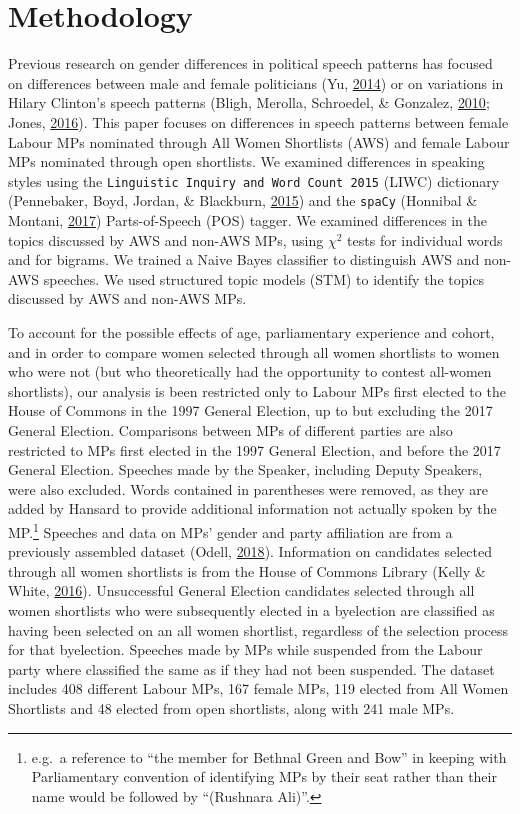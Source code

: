 \documentclass[]{article}
\let\rmarkdownfootnote\footnote%
\def\footnote{\protect\rmarkdownfootnote}
\begin{document}
\hypertarget{methodology}{%
\section{Methodology}\label{methodology}}

Previous research on gender differences in political speech patterns has
focused on differences between male and female politicians (Yu,
\protect\hyperlink{ref-yu2014}{2014}) or on variations in Hilary
Clinton's speech patterns (Bligh, Merolla, Schroedel, \& Gonzalez,
\protect\hyperlink{ref-bligh2010}{2010}; Jones,
\protect\hyperlink{ref-jones2016}{2016}). This paper focuses on
differences in speech patterns between female Labour MPs nominated
through All Women Shortlists (AWS) and female Labour MPs nominated
through open shortlists. We examined differences in speaking styles
using the \texttt{Linguistic\ Inquiry\ and\ Word\ Count\ 2015} (LIWC)
dictionary (Pennebaker, Boyd, Jordan, \& Blackburn,
\protect\hyperlink{ref-pennebaker2015}{2015}) and the \texttt{spaCy}
(Honnibal \& Montani, \protect\hyperlink{ref-honnibal2017}{2017})
Parts-of-Speech (POS) tagger. We examined differences in the topics
discussed by AWS and non-AWS MPs, using \({\chi}^2\) tests for
individual words and for bigrams. We trained a Naive Bayes classifier to
distinguish AWS and non-AWS speeches. We used structured topic models
(STM) to identify the topics discussed by AWS and non-AWS MPs.

To account for the possible effects of age, parliamentary experience and
cohort, and in order to compare women selected through all women
shortlists to women who were not (but who theoretically had the
opportunity to contest all-women shortlists), our analysis is been
restricted only to Labour MPs first elected to the House of Commons in
the 1997 General Election, up to but excluding the 2017 General
Election. Comparisons between MPs of different parties are also
restricted to MPs first elected in the 1997 General Election, and before
the 2017 General Election. Speeches made by the Speaker, including
Deputy Speakers, were also excluded. Words contained in parentheses were
removed, as they are added by Hansard to provide additional information
not actually spoken by the MP.\footnote{e.g.~a reference to ``the member
  for Bethnal Green and Bow'' in keeping with Parliamentary convention
  of identifying MPs by their seat rather than their name would be
  followed by ``(Rushnara Ali)''.} Speeches and data on MPs' gender and
party affiliation are from a previously assembled dataset (Odell,
\protect\hyperlink{ref-odell2018}{2018}). Information on candidates
selected through all women shortlists is from the House of Commons
Library (Kelly \& White, \protect\hyperlink{ref-kelly2016}{2016}).
Unsuccessful General Election candidates selected through all women
shortlists who were subsequently elected in a byelection are classified
as having been selected on an all women shortlist, regardless of the
selection process for that byelection. Speeches made by MPs while
suspended from the Labour party where classified the same as if they had
not been suspended. The dataset includes 408 different Labour MPs, 167
female MPs, 119 elected from All Women Shortlists and 48 elected from
open shortlists, along with 241 male MPs.
\end{document}
